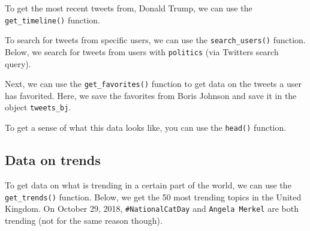 \documentclass[12pt,oneside]{reedthesis}
\theoremstyle{definition}
\theoremstyle{definition}
\theoremstyle{definition}
\theoremstyle{remark}
\begin{document}
  To get the most recent tweets from, Donald Trump, we can use the
  \texttt{get\_timeline()} function.
  \begin{Shaded}
  \begin{Highlighting}[]
  \StringTok{ }\NormalTok{(}\NormalTok{, } \NormalTok{)}
  \end{Highlighting}
  \end{Shaded}
  To search for tweets from specific users, we can use the
  \texttt{search\_users()} function. Below, we search for tweets from
  users with \texttt{politics} (via Twitters search query).
  \begin{Shaded}
  \begin{Highlighting}[]
  \StringTok{ }\NormalTok{(}\NormalTok{, } \NormalTok{)}
  \end{Highlighting}
  \end{Shaded}
  Next, we can use the \texttt{get\_favorites()} function to get data on
  the tweets a user has favorited. Here, we save the favorites from Boris
  Johnson and save it in the object \texttt{tweets\_bj}.
  \begin{Shaded}
  \begin{Highlighting}[]
  \StringTok{ }\NormalTok{(}\NormalTok{)}
  \end{Highlighting}
  \end{Shaded}
  To get a sense of what this data looks like, you can use the
  \texttt{head()} function.
  \begin{Shaded}
  \begin{Highlighting}[]
  \end{Highlighting}
  \end{Shaded}
  \subsection{Data on trends}\label{data-on-trends}
  
  To get data on what is trending in a certain part of the world, we can
  use the \texttt{get\_trends()} function. Below, we get the 50 most
  trending topics in the United Kingdom. On October 29, 2018,
  \texttt{\#NationalCatDay} and \texttt{Angela\ Merkel} are both trending
  (not for the same reason though).
  \begin{Shaded}
  \begin{Highlighting}[]
  \StringTok{ }\NormalTok{(}\NormalTok{)}
  \end{Highlighting}
  \end{Shaded}
\end{document}
